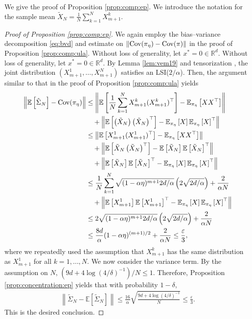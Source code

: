 \documentclass[12pt,reqno]{amsart}
\theoremstyle{remark}
\theoremstyle{definition}
\newcommand{\R}{\mathbb{R}}
\newcommand{\E}{\mathbb{E}}
\newcommand{\Cov}{\textnormal{Cov}}
\renewcommand{\epsilon}{\varepsilon}
\begin{document}
We give the proof of Proposition \ref{prop:comp:ep}.
We introduce the notation for the sample mean $\tilde{X}_{N} = \frac{1}{N}\sum_{k=1}^{N}X_{m+1}^{k}$.
\begin{proof}[Proof of Proposition \ref{prop:comp:ep}]
    We again employ the bias--variance decomposition \eqref{eq:bvd} and estimate on $\|\Cov(\pi_{\eta})-\Cov(\pi)\|$ in the proof of Proposition \ref{prop:comp:ula}. 
    Without loss of generality, let $x^{\ast}=0\in\R^{d}$.
Without loss of generality, let $x^{\ast}=0\in\R^{d}$.
By Lemma \ref{lem:vem19} and tensorization \citep{bakry2014analysis}, the joint distribution $(X_{m+1}^{1},\ldots,X_{m+1}^{N})$ satisfies an LSI($2/\alpha$).
Then, the argument similar to that in the proof of Proposition \ref{prop:comp:ula} yields
\begin{align*}
    \left\|\E\left[\hat{\Sigma}_{N}\right]-\Cov(\pi_{\eta})\right\|
    &\le \left\|\E\left[\frac{1}{N}\sum_{k=1}^{N}X_{m+1}^{k}(X_{m+1}^{k})^{\top}\right]-\E_{\pi_{\eta}}\left[XX^{\top}\right]\right\|\\
    &\quad+\left\|\E\left[\left(\tilde{X}_{N}\right)\left(\tilde{X}_{N}\right)^{\top}\right]-\E_{\pi_{\eta}}\left[X\right]\E_{\pi_{\eta}}\left[X\right]^{\top}\right\|\\
    &\le \left\|\E\left[X_{m+1}^{1}(X_{m+1}^{1})^{\top}\right]-\E_{\pi_{\eta}}\left[XX^{\top}\right]\right\|\\
    &\quad+\left\|\E\left[\tilde{X}_{N}\left(\tilde{X}_{N}\right)^{\top}\right]-\E\left[\tilde{X}_{N}\right]\E\left[\tilde{X}_{N}\right]^{\top}\right\|\\
    &\quad+\left\|\E\left[\tilde{X}_{N}\right]\E\left[\tilde{X}_{N}\right]^{\top}-\E_{\pi_{\eta}}\left[X\right]\E_{\pi_{\eta}}\left[X\right]^{\top}\right\|\\
    &\le \frac{1}{N}\sum_{k=1}^{N}\sqrt{(1-\alpha\eta)^{m+1}2d/\alpha}\left(2\sqrt{2d/\alpha}\right)+\frac{2}{\alpha N}\\
    &\quad+\left\|\E\left[X_{m+1}^{1}\right]\E\left[X_{m+1}^{1}\right]^{\top}-\E_{\pi_{\eta}}\left[X\right]\E_{\pi_{\eta}}\left[X\right]^{\top}\right\|\\
    &\le 2\sqrt{(1-\alpha\eta)^{m+1}2d/\alpha}\left(2\sqrt{2d/\alpha}\right)+\frac{2}{\alpha N}\\
    &\le \frac{8d}{\alpha}(1-\alpha\eta)^{(m+1)/2}+\frac{2}{\alpha N}\le \frac{\epsilon}{3},
\end{align*}
where we repeatedly used the assumption that $X_{m+1}^{k}$ has the same distribution as $X_{m+1}^{1}$ for all $k=1,\ldots,N$.
We now consider the variance term.
By the assumption on $N$, $(9d+4\log(4/\delta)^{-1})/N\le 1$. 
Therefore, Proposition \ref{prop:concentration:ep} yields that with probability $1-\delta$,
\begin{align*}
        \left\|\tilde{\Sigma}_{N}-\E\left[\tilde{\Sigma}_{N}\right]\right\|\le \frac{16}{\alpha}\sqrt{\frac{9d+4\log(4/\delta)^{-1}}{N}}\le \frac{\epsilon}{3}.
\end{align*}
This is the desired conclusion.
\end{proof}




\end{document}
